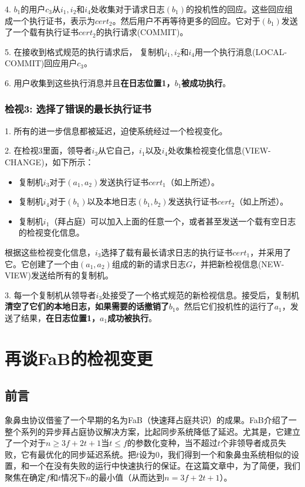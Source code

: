 \documentclass[UTF8]{ctexart}
\begin{document}
4. $b_1$的用户$c_3$从$i_1, i_2$和$i_4$处收集对于请求日志$(b_1)$的投机性的回应。这些回应组成一个执行证书，表示为$cert_2$。然后用户不再等待更多的回应。它对于$(b_1)$发送了一个载有执行证书$cert_2$的执行请求(COMMIT)。

5. 在接收到格式规范的执行请求后， 复制机$i_1, i_2$和$i_4$用一个执行消息(LOCAL-COMMIT)回应用户$c_3$。

6. 用户收集到这些执行消息并且\textbf{在日志位置1，$b_1$被成功执行}。
\subsubsection*{检视3: 选择了错误的最长执行证书}
1. 所有的进一步信息都被延迟，迫使系统经过一个检视变化。

2. 在检视$3$里面，领导者$i_3$从它自己，$i_1$以及$i_4$处收集检视变化信息(VIEW-CHANGE)，如下所示：
\begin{itemize}
	\item 复制机$i_3$对于$(a_1, a_2)$发送执行证书$cert_1$（如上所述）。
	\item 复制机$i_4$对于$(b_1)$以及本地日志$(b_1, b_2)$发送执行证书$cert_2$（如上所述）。
	\item 复制机$i_1$（拜占庭）可以加入上面的任意一个，或者甚至发送一个载有空日志的检视变化信息。
\end{itemize}
根据这些检视变化信息，$i_3$选择了载有最长请求日志的执行证书$cert_1$，并采用了它。它创建了一个由$(a_1, a_2)$组成的新的请求日志$G$，并把新检视信息(NEW-VIEW)发送给所有的复制机。

3. 每一个复制机从领导者$i_3$处接受了一个格式规范的新检视信息。接受后，复制机\textbf{清空了它们的本地日志，如果需要的话撤销了$b_1$}。然后它们投机性的运行了$a_1$，发送了结果，\textbf{在日志位置1，$a_1$成功被执行}。

\section{再谈FaB的检视变更}\label{sec:FaB}
\subsection{前言}
象鼻虫协议借鉴了一个早期的名为FaB（快速拜占庭共识）的成果。FaB介绍了一整个系列的异步拜占庭协议解决方案，比起同步系统降低了延迟。尤其是，它建立了一个对于$n \ge 3f + 2t + 1$当$t \le f$的参数化变种，当不超过$t$个非领导者成员失败，它有最优化的同步延迟系统。把$t$设为$0$，我们得到一个和象鼻虫系统相似的设置，和一个在没有失败的运行中快速执行的保证。在这篇文章中，为了简便，我们聚焦在确定$f$和$t$情况下$n$的最小值（从而达到$n = 3f + 2t + 1$）。
\end{document}
